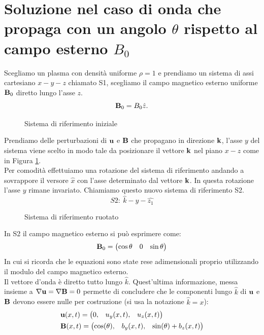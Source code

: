 \section{Soluzione nel caso di onda che propaga con un angolo $\theta$ rispetto al campo esterno $B_0$}
Scegliamo un plasma con densità uniforme $\rho = 1$ e prendiamo un sistema di assi cartesiano $x-y-z$ chiamato S1, scegliamo il campo magnetico esterno uniforme $\vv{B}_0$ diretto lungo l'asse $z$.
\[
    \vv{B}_0 = B_0 \hat{z}.
\]
\begin{figure}[H]
    \centering
    
    \caption{Sistema di riferimento iniziale}
    \label{fig:sis_in}
\end{figure}
\noindent
Prendiamo delle perturbazioni di $\vv{u}$ e $\vv{B}$ che propagano in direzione $\vv{k}$, l'asse $y$ del sistema viene scelto in modo tale da posizionare il vettore $\vv{k}$ nel piano $x-z$ come in Figura \ref{fig:sis_in}.\\
Per comodità effettuiamo una rotazione del sistema di riferimento andando a sovrappore il versore $\hat{x}$ con l'asse determinato dal vettore $\vv{k}$. In questa rotazione l'asse $y$ rimane invariato. Chiamiamo questo nuovo sistema di riferimento S2.
\[S2: \ \hat{k}-\hat{y}-\hat{z_1} \]
\begin{figure}[H]
    \centering
    
    \caption{Sistema di riferimento ruotato}
    \label{fig:sis_fin}
\end{figure}
In S2 il campo magnetico esterno si può esprimere come:
\[
    \vv{B}_0 =
    \begin{pmatrix}
        \cos\theta &
        0              &
        \sin\theta\end{pmatrix}
\]
In cui si ricorda che le equazioni sono state rese adimensionali proprio utilizzando il modulo del campo magnetico esterno.\\
Il vettore d'onda è diretto tutto lungo $\hat{k}$. Quest'ultima informazione, messa insieme a $\nabla \vv{u} = \nabla \vv{B} = 0$ permette di concludere che le componenti lungo $\hat{k}$ di $\vv{u}$ e $\vv{B}$ devono essere nulle per costruzione (si usa la notazione $\hat{k} = x$):
\begin{align*}
     & \vv{u}(x, t) = \begin{pmatrix}
                          0, & u_{y}(x, t), & u_{z}(x, t)
                      \end{pmatrix}                                   \\
     & \vv{B}(x, t) = \begin{pmatrix}
                          \cos(\theta), & b_{y}(x, t), & \sin(\theta) + b_{z}(x, t)
                      \end{pmatrix}
\end{align*}
